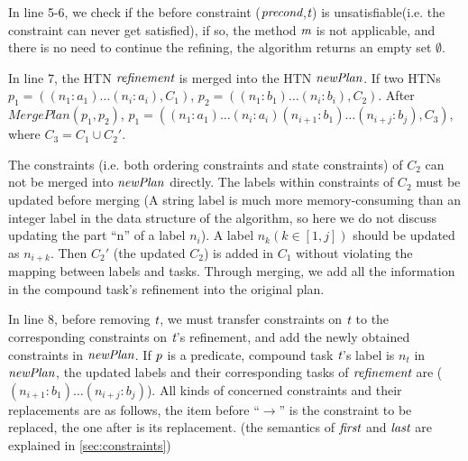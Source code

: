 In line 5-6, we check if the before constraint ($\emph{precond}$,$\emph{t}$) is unsatisfiable(i.e. the constraint can never get satisfied), if so, the method $\emph{m}$ is not applicable, and there is no need to continue the refining, the algorithm returns an empty set $\emptyset$.

In line 7, the HTN $\emph{refinement}$ is merged into the HTN $\emph{newPlan}$. If two HTNs $p_1 = ((n_1: a_1) \ldots (n_i: a_i), C_1)$, $p_2 = ((n_1: b_1) \ldots (n_i: b_i), C_2)$. After $MergePlan(p_1, p_2)$, $p_1 = ((n_1: a_1) \ldots (n_i: a_i) (n_{i+1}: b_1) \ldots (n_{i+j}: b_j), C_3)$, where $C_3 = C_1 \cup C_2'$.

The constraints (i.e. both ordering constraints and state constraints) of $C_2$ can not be merged into $\emph{newPlan}$ directly. The labels within constraints of $C_2$ must be updated before merging (A string label is much more memory-consuming than an integer label in the data structure of the algorithm, so here we do not discuss updating the part “n” of a label $n_i$). A label $n_k (k \in [1, j])$ should be updated as $n_{i+k}$. Then $C_2'$ (the updated $C_2$) is added in $C_1$ without violating the mapping between labels and tasks. Through merging, we add all the information in the compound task’s refinement into the original plan.

In line 8, before removing $\emph{t}$, we must transfer constraints on $\emph{t}$ to the corresponding constraints on $\emph{t}$’s refinement, and add the newly obtained constraints in $\emph{newPlan}$. If $\emph{p}$ is a predicate, compound task $\emph{t}$’s label is $n_t$ in $\emph{newPlan}$, the updated labels and their corresponding tasks of $\emph{refinement}$ are ($(n_{i+1}: b_1) \ldots (n_{i+j}: b_j)$). All kinds of concerned constraints and their replacements are as follows, the item before “$\rightarrow$” is the constraint to be replaced, the one after is its replacement. (the semantics of $\emph{first}$ and $\emph{last}$ are explained in \autoref{sec:constraints})

